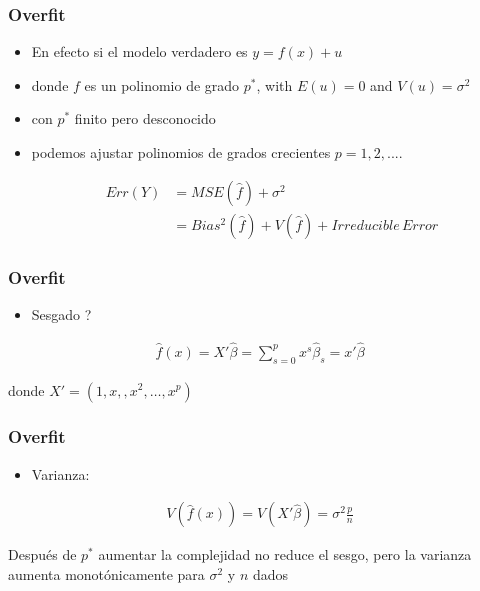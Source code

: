 \documentclass[
  shownotes,
  xcolor={svgnames},
  hyperref={colorlinks,citecolor=DarkBlue,linkcolor=DarkRed,urlcolor=DarkBlue}
  , aspectratio=169]{beamer}
\begin{document}
\begin{frame}[fragile]
\frametitle{Overfit}


\begin{itemize}

  \item En efecto si el modelo verdadero es $y=f(x) +u$ 
  \medskip
  \item donde $f$ es un polinomio de grado $p^*$, with $E(u)=0$ and $V(u)=\sigma^2$
  \medskip
  \item con $p^*$ finito pero desconocido
  \medskip
  \item  podemos ajustar polinomios de grados crecientes $p=1,2,....$
  
  \begin{align}
  Err (  Y )  &= MSE(\hat f) + \sigma^2  \\
                 &= Bias^2(\hat f) + V(\hat f)  + Irreducible\,Error        
  \end{align}

  
\end{itemize}

\end{frame}
\begin{frame}[fragile]
\frametitle{Overfit}


\begin{itemize}

  \item Sesgado ?

\end{itemize}

  \begin{align}
  \hat f(x) = X'\hat\beta=\sum_{s=0}^p x^s\hat\beta_s = x'\hat\beta  
  \end{align}

  donde $X'=(1,x,,x^2,\dots,x^p)$



\end{frame}
\begin{frame}[fragile]
\frametitle{Overfit}


\begin{itemize}

  \item Varianza:
\end{itemize}

 
  \begin{align}
  V(\hat f(x) ) = V(X'\hat\beta) = \sigma^2 \frac{p}{n}
  \end{align}

 

Después de  $p^*$ aumentar la complejidad no reduce el sesgo, pero la varianza aumenta monotónicamente para  $\sigma^2$ y $n$ dados
 
\end{frame}
\end{document}

